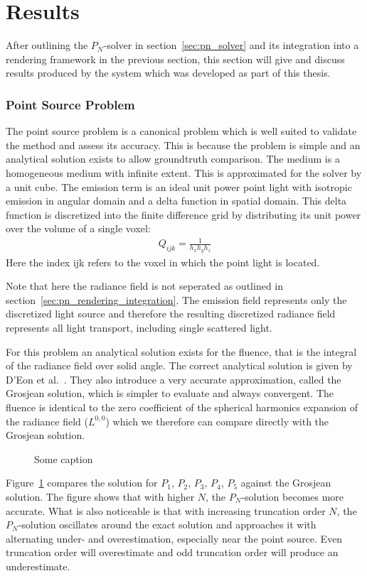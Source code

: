 \section{Results}
\label{sec:pn_results}

After outlining the $P_N$-solver in section~\ref{sec:pn_solver} and its integration into a rendering framework in the previous section, this section will give and discuss results produced by the system which was developed as part of this thesis.

\subsubsection{Point Source Problem}

The point source problem is a canonical problem which is well suited to validate the method and assess its accuracy. This is because the problem is simple and an analytical solution exists to allow groundtruth comparison. The medium is a homogeneous medium with infinite extent. This is approximated for the solver by a unit cube. The emission term is an ideal unit power point light with isotropic emission in angular domain and a delta function in spatial domain. This delta function is discretized into the finite difference grid by distributing its unit power over the volume of a single voxel:
\begin{align}
Q_{ijk} = \frac{1}{h_xh_yh_z}
\end{align}
Here the index {ijk} refers to the voxel in which the point light is located.

Note that here the radiance field is not seperated as outlined in section~\ref{sec:pn_rendering_integration}. The emission field represents only the discretized light source and therefore the resulting discretized radiance field represents all light transport, including single scattered light.

For this problem an analytical solution exists for the fluence, that is the integral of the radiance field over solid angle. The correct analytical solution is given by D'Eon et al.~\cite{dEon11}. They also introduce a very accurate approximation, called the Grosjean solution, which is simpler to evaluate and always convergent. The fluence is identical to the zero coefficient of the spherical harmonics expansion of the radiance field ($L^{0,0}$) which we therefore can compare directly with the Grosjean solution.
\begin{figure}[h]
\centering
{}
\caption{Some caption}
\label{fig:pn_results_pointsource_1}
\end{figure}
Figure~\ref{fig:pn_results_pointsource_1} compares the solution for $P_1$, $P_2$, $P_3$, $P_4$, $P_5$ against the Grosjean solution. The figure shows that with higher $N$, the $P_N$-solution becomes more accurate. What is also noticeable is that with increasing truncation order $N$, the $P_N$-solution oscillates around the exact solution and approaches it with alternating under- and overestimation, especially near the point source. Even truncation order will overestimate and odd truncation order will produce an underestimate. 

